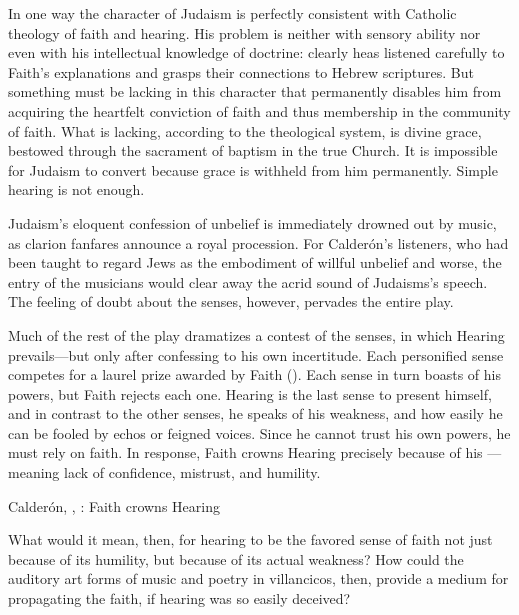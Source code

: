In one way the character of Judaism is perfectly consistent with Catholic theology of faith and hearing.
His problem is neither with sensory ability nor even with his intellectual knowledge of doctrine: clearly heas listened carefully to Faith's explanations and grasps their connections to Hebrew scriptures.
But something must be lacking in this character that permanently disables him from acquiring the heartfelt conviction of faith and thus membership in the community of faith.
What is lacking, according to the theological system, is divine grace, bestowed through the sacrament of baptism in the true Church.
It is impossible for Judaism to convert because grace is withheld from him permanently.%
Simple hearing is not enough.

Judaism's eloquent confession of unbelief is immediately drowned out by music, as clarion fanfares announce a royal procession.
For Calderón's listeners, who had been taught to regard Jews as the embodiment of willful unbelief and worse, the entry of the musicians would clear away the acrid sound of Judaisms's speech.
The feeling of doubt about the senses, however, pervades the entire play.

Much of the rest of the play dramatizes a contest of the senses, in which Hearing prevails---but only after confessing to his own incertitude.
Each personified sense competes for a laurel prize awarded by Faith ().
Each sense in turn boasts of his powers, but Faith rejects each one.
Hearing is the last sense to present himself, and in contrast to the other senses, he speaks of his weakness, and how easily he can be fooled by echos or feigned voices.
Since he cannot trust his own powers, he must rely on faith.
In response, Faith crowns Hearing precisely because of his ---meaning lack of confidence, mistrust, and humility.

\begin{expoem}
    \caption{Calderón, , : Faith crowns Hearing}
    \label{expoem:Calderon-Retiro-Hearing}
\end{expoem}

What would it mean, then, for hearing to be the favored sense of faith not just because of its humility, but because of its actual weakness?
How could the auditory art forms of music and poetry in villancicos, then, provide a medium for propagating the faith, if hearing was so easily deceived?

